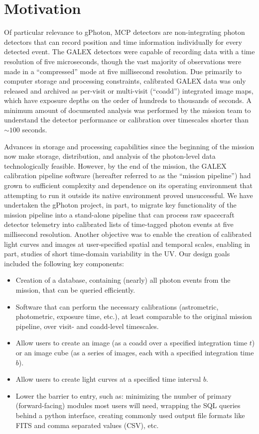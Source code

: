 \documentclass[5p]{elsarticle}
\begin{document}
\section{Motivation}
\label{motivation}
Of particular relevance to gPhoton, MCP detectors are non-integrating photon detectors that can record position and time information individually for every detected event.  The GALEX detectors were capable of recording data with a time resolution of five microseconds, though the vast majority of observations were made in a ``compressed'' mode at five millisecond resolution. Due primarily to computer storage and processing constraints, calibrated GALEX data was only released and archived as per-visit or multi-visit (``coadd'') integrated image maps, which have exposure depths on the order of hundreds to thousands of seconds. A minimum amount of documented analysis was performed by the mission team to understand the detector performance or calibration over timescales shorter than $\sim 100$ seconds.

Advances in storage and processing capabilities since the beginning of the mission now make storage, distribution, and analysis of the photon-level data technologically feasible. However, by the end of the mission, the GALEX calibration pipeline software (hereafter referred to as the ``mission pipeline'') had grown to sufficient complexity and dependence on its operating environment that attempting to run it outside its native environment proved unsuccessful.  We have undertaken the gPhoton project, in part, to migrate key functionality of the mission pipeline into a stand-alone pipeline that can process raw spacecraft detector telemetry into calibrated lists of time-tagged photon events at five millisecond resolution. Another objective was to enable the creation of calibrated light curves and images at user-specified spatial and temporal scales, enabling in part, studies of short time-domain variability in the UV.  Our design goals included the following key components:
\begin{itemize}
\item{Creation of a database, containing (nearly) all photon events from the mission, that can be queried efficiently.}
\item{Software that can perform the necessary calibrations (astrometric, photometric, exposure time, etc.), at least comparable to the original mission pipeline, over visit- and coadd-level timescales.}
\item{Allow users to create an image (as a coadd over a specified integration time $t$) or an image cube (as a series of images, each with a specified integration time $b$).}
\item{Allow users to create light curves at a specified time interval $b$.}
\item{Lower the barrier to entry, such as: minimizing the number of primary (forward-facing) modules most users will need, wrapping the SQL queries behind a python interface, creating commonly used output file formats like FITS and comma separated values (CSV), etc.}
\end{itemize}
\end{document}
